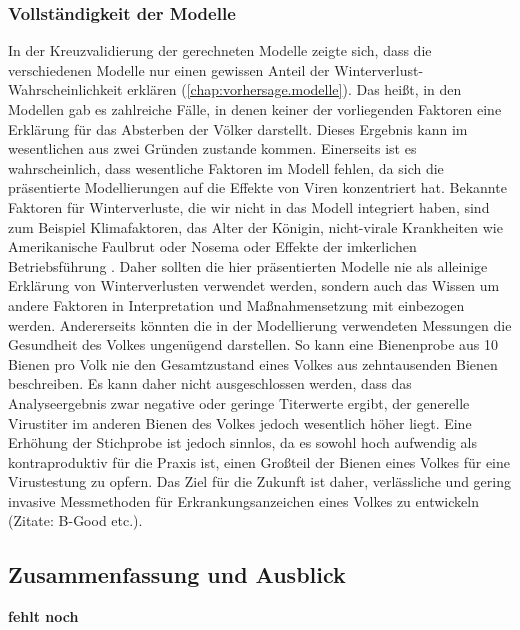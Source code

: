 \subsubsection{Vollständigkeit der Modelle}

In der Kreuzvalidierung der gerechneten Modelle zeigte sich, dass die verschiedenen Modelle nur einen gewissen Anteil der Winterverlust-Wahrscheinlichkeit erklären (\cref{chap:vorhersage.modelle}). Das heißt, in den Modellen gab es zahlreiche Fälle, in denen keiner der vorliegenden Faktoren eine Erklärung für das Absterben der Völker darstellt. Dieses Ergebnis kann im wesentlichen aus zwei Gründen zustande kommen. Einerseits ist es wahrscheinlich, dass wesentliche Faktoren im Modell fehlen, da sich die präsentierte Modellierungen auf die Effekte von Viren konzentriert hat. Bekannte Faktoren für Winterverluste, die wir nicht in das Modell integriert haben, sind zum Beispiel Klimafaktoren, das Alter der Königin, nicht-virale Krankheiten wie Amerikanische Faulbrut oder Nosema oder Effekte der imkerlichen Betriebsführung \citep{brodschneider2018,chauzat2016,morawetz2019,switanek2017}. Daher sollten die hier präsentierten Modelle nie als alleinige Erklärung von Winterverlusten verwendet werden, sondern auch das Wissen um andere Faktoren in Interpretation und Maßnahmensetzung mit einbezogen werden.
Andererseits könnten die in der Modellierung verwendeten Messungen die Gesundheit des Volkes ungenügend darstellen. So kann eine Bienenprobe aus 10 Bienen pro Volk nie den Gesamtzustand eines Volkes aus zehntausenden Bienen beschreiben. Es kann daher nicht ausgeschlossen werden, dass das Analyseergebnis zwar negative oder geringe Titerwerte ergibt, der generelle Virustiter im anderen Bienen des Volkes jedoch wesentlich höher liegt. Eine Erhöhung der Stichprobe ist jedoch sinnlos, da es sowohl hoch aufwendig als kontraproduktiv für die Praxis ist, einen Großteil der Bienen eines Volkes für eine  Virustestung zu opfern. Das Ziel für die Zukunft ist daher, verlässliche und gering invasive Messmethoden für Erkrankungsanzeichen eines Volkes zu entwickeln (Zitate: B-Good etc.).

\subsection{Zusammenfassung und Ausblick}

\textbf{fehlt noch}